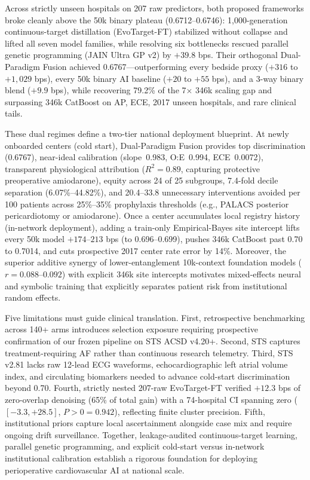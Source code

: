 Across strictly unseen hospitals on 207 raw predictors, both proposed frameworks broke cleanly above the 50k binary plateau (0.6712--0.6746): 1,000-generation continuous-target distillation (EvoTarget-FT) stabilized without collapse and lifted all seven model families, while resolving six bottlenecks rescued parallel genetic programming (JAIN Ultra GP v2) by $+39.8$ bps. Their orthogonal Dual-Paradigm Fusion achieved 0.6767---outperforming every bedside proxy ($+316$ to $+1{,}029$ bps), every 50k binary AI baseline ($+20$ to $+55$ bps), and a 3-way binary blend ($+9.9$ bps), while recovering 79.2\% of the 7$\times$ 346k scaling gap and surpassing 346k CatBoost on AP, ECE, 2017 unseen hospitals, and rare clinical tails.

These dual regimes define a two-tier national deployment blueprint. At newly onboarded centers (cold start), Dual-Paradigm Fusion provides top discrimination (0.6767), near-ideal calibration (slope~0.983, O:E~0.994, ECE~0.0072), transparent physiological attribution ($R^2 = 0.89$, capturing protective preoperative amiodarone), equity across 24 of 25 subgroups, 7.4-fold decile separation (6.07\%--44.82\%), and 20.4--33.8 unnecessary interventions avoided per 100 patients across 25\%--35\% prophylaxis thresholds (e.g., PALACS posterior pericardiotomy\cite{gaudino2021palacs} or amiodarone). Once a center accumulates local registry history (in-network deployment), adding a train-only Empirical-Bayes site intercept lifts every 50k model $+174$--$213$ bps (to 0.696--0.699), pushes 346k CatBoost past 0.70 to 0.7014, and cuts prospective 2017 center rate error by 14\%. Moreover, the superior additive synergy of lower-entanglement 10k-context foundation models ($r=0.088$--$0.092$) with explicit 346k site intercepts motivates mixed-effects neural and symbolic training that explicitly separates patient risk from institutional random effects.

Five limitations must guide clinical translation. First, retrospective benchmarking across 140+ arms introduces selection exposure requiring prospective confirmation of our frozen pipeline on STS ACSD v4.20+. Second, STS  captures treatment-requiring AF rather than continuous research telemetry.\cite{filardo2017telemetry,perezgrovas2023jaha} Third, STS v2.81 lacks raw 12-lead ECG waveforms, echocardiographic left atrial volume index, and circulating biomarkers needed to advance cold-start discrimination beyond 0.70.\cite{han2025aiecg,khalpey2026digital} Fourth, strictly nested 207-raw EvoTarget-FT verified $+12.3$ bps of zero-overlap denoising (65\% of total gain) with a 74-hospital CI spanning zero ($[-3.3, +28.5]$, $P>0=0.942$), reflecting finite cluster precision. Fifth, institutional priors capture local ascertainment alongside case mix and require ongoing drift surveillance. Together, leakage-audited continuous-target learning, parallel genetic programming, and explicit cold-start versus in-network institutional calibration establish a rigorous foundation for deploying perioperative cardiovascular AI at national scale.
